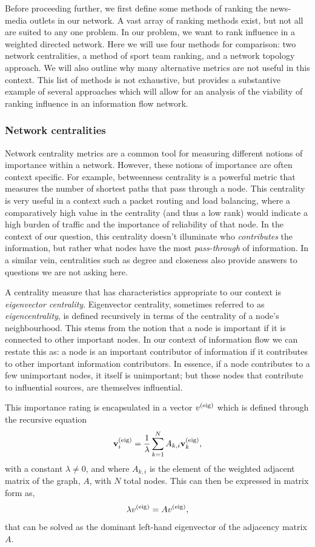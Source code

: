 Before proceeding further, we first define some methods of ranking the news-media outlets in our network. A vast array of ranking methods exist, but not all are suited to any one problem. In our problem, we want to rank influence in a weighted directed network. Here we will use four methods for comparison: two network centralities, a method of sport team ranking, and a network topology approach. We will also outline why many alternative metrics are not useful in this context. This list of methods is not exhaustive, but provides a substantive example of several approaches which will allow for an analysis of the viability of ranking influence in an information flow network. 

\subsubsection{Network centralities}

Network centrality metrics are a common tool for measuring different notions of importance within a network. However, these notions of importance are often context specific. For example, betweenness centrality is a powerful metric that measures the number of shortest paths that pass through a node. This centrality is very useful in a context such a packet routing and load balancing, where a comparatively high value in the centrality (and thus a low rank) would indicate a high burden of traffic and the importance of reliability of that node. In the context of our question, this centrality doesn't illuminate who \emph{contributes} the information, but rather what nodes have the most \emph{pass-through} of information. In a similar vein, centralities such as degree and closeness also provide answers to questions we are not asking here.

A centrality measure that has characteristics appropriate to our context is \emph{eigenvector centrality}. Eigenvector centrality, sometimes referred to as \emph{eigencentrality}, is defined recursively in terms of the centrality of a node's neighbourhood. This stems from the notion that a node is important if it is connected to other important nodes. In our context of information flow we can restate this as: a node is an important contributor of information if it contributes to other important information contributors. In essence, if a node contributes to a few unimportant nodes, it itself is unimportant; but those nodes that contribute to influential sources, are themselves influential.

This importance rating is encapsulated in a vector $v^{\rm(eig)}$ which is defined through the recursive equation
\begin{equation}\label{eq:eigenvector}
\textbf{v}_{i}^{\rm(eig)}=\frac{1}{\lambda} \sum_{k=1}^{N} A_{k, i} \textbf{v}_{k}^{\rm(eig)},
\end{equation}
with a constant $\lambda \neq 0$, and where $A_{k, i}$ is the element of the weighted adjacent matrix of the graph, $A$, with $N$ total nodes. This can then be expressed in matrix form as,
\begin{equation}
\lambda v^{\rm(eig)} = A v^{\rm(eig)}, 
\end{equation}
that can be solved as the dominant left-hand eigenvector of the adjacency matrix $A$. 

